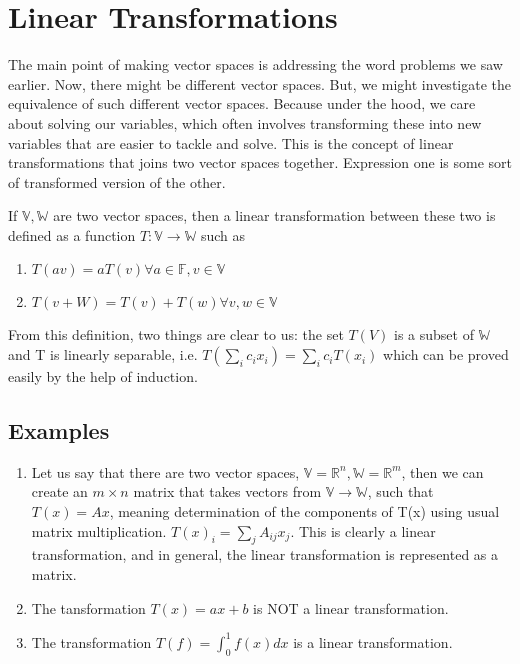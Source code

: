 \section{Linear Transformations}

The main point of making vector spaces is addressing the word problems we saw earlier. Now, there might be different vector spaces. But, we might investigate the equivalence of such different vector spaces. Because under the hood, we care about solving our variables, which often involves transforming these into new variables that are easier to tackle and solve. This is the concept of linear transformations that joins two vector spaces together. Expression one is some sort of transformed version of the other. 

\begin{outline}
    If $\mathbb{V}, \mathbb{W}$ are two vector spaces, then a linear transformation between these two is defined as a function $T: \mathbb{V} \to \mathbb{W}$ such as 
    \begin{enumerate}
        \item $T(av)=aT(v) \forall a\in \mathbb{F}, v\in \mathbb{V}$
        \item $T(v+W)=T(v)+T(w) \forall v,w \in \mathbb{V}$
    \end{enumerate}
\end{outline}

From this definition, two things are clear to us:
the set $T(V)$ is a subset of $\mathbb{W}$ and T is linearly separable, i.e. $T(\sum_{i}c_ix_i)=\sum_i c_i T(x_i)$ which can be proved easily by the help of induction.

\subsection{Examples}

\begin{enumerate}
    \item Let us say that there are two vector spaces, $\mathbb{V}=\mathbb{R}^n, \mathbb{W}=\mathbb{R}^m$, then we can create an $m \times n$ matrix that takes vectors from $\mathbb{V}\to \mathbb{W}$, such that $T(x)=Ax$, meaning determination of the components of T(x) using usual matrix multiplication. $T(x)_i = \sum_j A_{ij}x_j$. This is clearly a linear transformation, and in general, the linear transformation is represented as a matrix. 
    \item The tansformation $T(x)=ax+b$ is NOT a linear transformation.
    \item The transformation $T(f)=\int_{0}^{1}f(x)dx$ is a linear transformation. 
    \end{enumerate}


